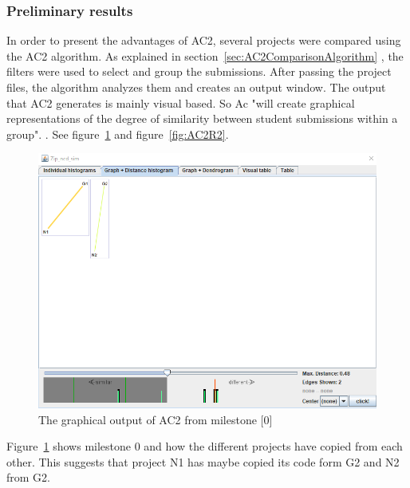 \documentclass[a4paper, 11pt]{article}
\renewcommand{\\}{\vspace*{0.5\baselineskip} \newline}
\begin{document}
\subsubsection{Preliminary results}

In order to present the advantages of AC2, several projects were compared using the AC2 algorithm. As explained in section~\ref{sec:AC2ComparisonAlgorithm} , the filters were used to select and group the submissions. After passing the project files, the algorithm analyzes them and creates an output window. The output that AC2 generates is mainly visual based. So Ac "will create graphical representations of the degree of similarity between student submissions within a group". \autocite{AC2}. See figure~\ref{fig:AC2R1} and figure~\ref{fig:AC2R2}.

\begin{figure}[h]
	\centering
	\includegraphics[height=0.2\textheight]{figs/AC2/M0_1.png}
	\caption{The graphical output of AC2 from milestone [0]}
	\label{fig:AC2R1}
\end{figure}
Figure~\ref{fig:AC2R1} shows milestone 0 and how the different projects have copied from each other. This suggests that project N1 has maybe copied its code form G2 and N2 from G2.
\end{document}
